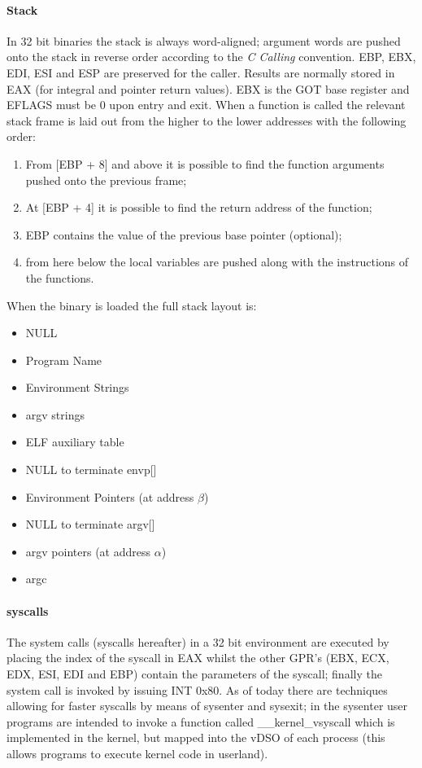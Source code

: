\paragraph{Stack}
In 32 bit binaries the stack is always word-aligned; argument words are pushed onto the stack in reverse order according
to the \textit{C Calling} convention. {\ttfamily EBP}, {\ttfamily EBX}, {\ttfamily EDI}, {\ttfamily ESI} and {\ttfamily
ESP} are preserved for the caller. Results are normally stored in {\ttfamily EAX} (for integral and pointer return values).
{\ttfamily EBX} is the GOT base register and {\ttfamily EFLAGS} must be 0 upon entry and exit. When a function is
called the relevant stack frame is laid out from the higher to the lower addresses with the following order:
\begin{enumerate}
    \item From [{\ttfamily EBP + 8}] and above it is possible to find the function arguments pushed onto the previous
        frame;
    \item At [{\ttfamily EBP + 4}] it is possible to find the return address of the function;
    \item {\ttfamily EBP} contains the value of the previous base pointer (optional);
    \item from here below the local variables are pushed along with the instructions of the functions.
\end{enumerate}
When the binary is loaded the full stack layout is:
\begin{itemize}
    \item NULL
    \item Program Name
    \item Environment Strings
    \item {\ttfamily argv} strings
    \item ELF auxiliary table
    \item NULL to terminate {\ttfamily envp[]}
    \item Environment Pointers (at address $\beta$)
    \item NULL to terminate {\ttfamily argv[]}
    \item {\ttfamily argv} pointers (at address $\alpha$)
    \item {\ttfamily argc}
\end{itemize}
\paragraph{{\ttfamily syscalls}}
The system calls (syscalls hereafter) in a 32 bit environment are executed by placing the index of the syscall in
EAX whilst the other GPR's (EBX, ECX, EDX, ESI, EDI and EBP) contain the parameters of the syscall; finally
the system call is invoked by issuing {\ttfamily INT 0x80}.
As of today there are techniques allowing for faster syscalls by means of {\ttfamily sysenter} and {\ttfamily sysexit};
in the {\ttfamily sysenter} user programs are intended to invoke a function called {\ttfamily \_\_kernel\_vsyscall}
which is implemented in the kernel, but mapped into the vDSO of each process (this allows programs to execute kernel
code in userland).

